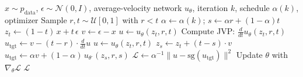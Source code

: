 \begin{algorithm}[htbp]
\caption{AlphaFlow Training}
\label{alg:alphaflow}
\begin{algorithmic}[1]
\Require $x \sim p_{\text{data}}$, $\epsilon \sim \mathcal{N}(0,I)$, average-velocity network $u_\theta$, iteration $k$, schedule $\alpha(k)$, optimizer
\State Sample $r, t \sim \mathcal{U}[0,1]$ with $r < t$
\State $\alpha \gets \alpha(k)$; \quad $s \gets \alpha r + (1-\alpha) t$
\State $z_t \gets (1 - t) \, x + t \, \epsilon$ 
\State $v \gets \epsilon - x$ 
    \State $u \gets u_\theta(z_t, r, t)$
    \State Compute JVP: $\tfrac{d}{dt} u_\theta(z_t, r, t)$
    \State $u_{\text{tgt}} \gets v - (t - r) \cdot \tfrac{d}{dt} u$ 
\Else
    \State $u \gets u_\theta(z_t, r, t)$
    \State $z_s \gets z_t + (t - s) \cdot v$
    \State $u_{\text{tgt}} \gets \alpha v + (1 - \alpha) \, u_{\theta^\text{-}}(z_s, r, s)$ 
\EndIf
\State $\mathcal{L} \gets \alpha^{-1} \| u - \text{sg}(u_{\text{tgt}}) \|^2$
\State Update $\theta$ with $\nabla_\theta \mathcal{L}$
\State \Return $\mathcal{L}$
\end{algorithmic}
\end{algorithm}
